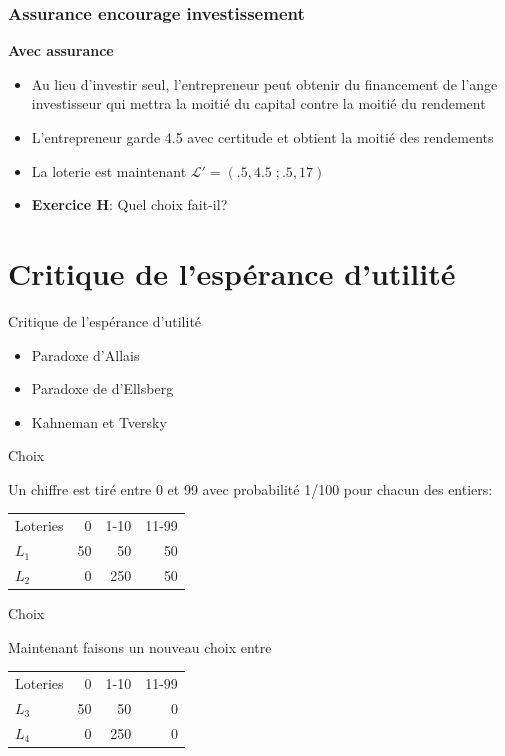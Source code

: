 \documentclass[handout]{beamer}
\newenvironment{iPar}[1]{\textbf{#1} \begin{itemize}}{\end{itemize}}
\newcommand{\mc}{\mathcal}
\begin{document}
\begin{frame}\frametitle{Assurance encourage investissement}

\begin{iPar}{Avec assurance} \item Au lieu d'investir seul,
l'entrepreneur peut obtenir du financement de l'ange investisseur qui mettra la moitié du capital contre la moitié du rendement \item L'entrepreneur garde 4.5 avec certitude et obtient la moitié des rendements \item La loterie est maintenant $\mc L' = (.5,4.5 \;; .5,17)$ \item \textbf{Exercice H}: Quel choix fait-il?\end{iPar}

 \end{frame}

\section{Critique de l'espérance d'utilité}



\begin{frame}{Critique de l'espérance d'utilité}
\begin{itemize}
\item Paradoxe d'Allais
\item Paradoxe de d'Ellsberg
\item Kahneman et Tversky
\end{itemize}
\end{frame}


\begin{frame}{Choix}


Un chiffre est tiré entre 0 et 99 avec probabilité 1/100 pour chacun des entiers: 

\begin{table}[H]
\begin{tabular}{lrrr}
\hline \hline
Loteries & 0 & 1-10 & 11-99 \\
$L_1$ & 50 & 50 & 50 \\
$L_2$ & 0 & 250 & 50 \\
\hline \hline 
\end{tabular}
\end{table} 


\end{frame}

\begin{frame}{Choix}

Maintenant faisons un nouveau choix entre

\begin{table}[H]
\begin{tabular}{lrrr}
\hline \hline
Loteries & 0 & 1-10 & 11-99 \\
$L_3$ & 50 & 50 & 0 \\
$L_4$ & 0 & 250 & 0 \\
\hline \hline 
\end{tabular}
\end{table} 

\end{frame}
\end{document}
